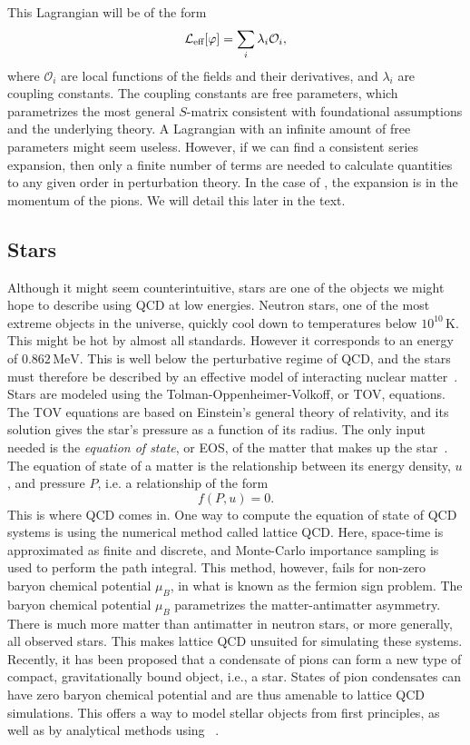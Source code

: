 This Lagrangian will be of the form
\begin{equation}
    \mathcal{L}_\text{eff}[\varphi] = \sum_i \lambda_i \mathcal O_i,
\end{equation}
where $\mathcal O_i$ are local functions of the fields and their derivatives, and $\lambda_i$ are coupling constants.
The coupling constants are free parameters, which parametrizes the most general $S$-matrix consistent with foundational assumptions and the underlying theory.
A Lagrangian with an infinite amount of free parameters might seem useless. 
However, if we can find a consistent series expansion, then only a finite number of terms are needed to calculate quantities to any given order in perturbation theory.
In the case of \chpt, the expansion is in the momentum of the pions.
We will detail this later in the text.


\subsection*{Stars}

Although it might seem counterintuitive, stars are one of the objects we might hope to describe using QCD at low energies.
Neutron stars, one of the most extreme objects in the universe, quickly cool down to temperatures below $10^{10} \, \text{K}$.
This might be hot by almost all standards. 
However it corresponds to an energy of $0.862 \, \text{MeV}$.
This is well below the perturbative regime of QCD, and the stars must therefore be described by an effective model of interacting nuclear matter~\cite{glendenning:compcat_stars,from_hadrons_to_quarks}.
Stars are modeled using the Tolman-Oppenheimer-Volkoff, or TOV, equations.
The TOV equations are based on Einstein's general theory of relativity, and its solution gives the star's pressure as a function of its radius.
The only input needed is the \emph{equation of state}, or EOS, of the matter that makes up the star~\cite{Carroll:spacetime}.
The equation of state of a matter is the relationship between its energy density, $u$, and pressure $P$, i.e. a relationship of the form
\begin{equation}
    f(P, u) = 0.
\end{equation}
This is where QCD comes in.
One way to compute the equation of state of QCD systems is using the numerical method called lattice QCD.
Here, space-time is approximated as finite and discrete, and Monte-Carlo importance sampling is used to perform the path integral.
This method, however, fails for non-zero baryon chemical potential $\mu_B$, in what is known as the fermion sign problem.
The baryon chemical potential $\mu_B$ parametrizes the matter-antimatter asymmetry.
There is much more matter than antimatter in neutron stars, or more generally, all observed stars.
This makes lattice QCD unsuited for simulating these systems.
Recently, it has been proposed that a condensate of pions can form a new type of compact, gravitationally bound object, i.e., a star.
States of pion condensates can have zero baryon chemical potential and are thus amenable to lattice QCD simulations.
This offers a way to model stellar objects from first principles, as well as by analytical methods using \chpt~\cite{new_clas_of_compact_stars,andersen:bose_einstein}.

